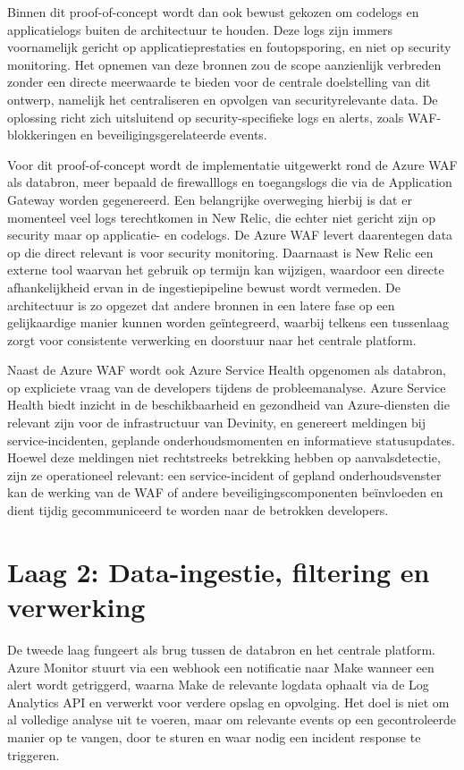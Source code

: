Binnen dit proof-of-concept wordt dan ook bewust gekozen om codelogs en applicatielogs buiten de architectuur te houden. Deze logs zijn immers voornamelijk gericht op applicatieprestaties en foutopsporing, en niet op security monitoring. Het opnemen van deze bronnen zou de scope aanzienlijk verbreden zonder een directe meerwaarde te bieden voor de centrale doelstelling van dit ontwerp, namelijk het centraliseren en opvolgen van securityrelevante data. De oplossing richt zich uitsluitend op security-specifieke logs en alerts, zoals WAF-blokkeringen en beveiligingsgerelateerde events.

Voor dit proof-of-concept wordt de implementatie uitgewerkt rond de Azure WAF als databron, meer bepaald de firewalllogs en toegangslogs die via de Application Gateway worden gegenereerd. Een belangrijke overweging hierbij is dat er momenteel veel logs terechtkomen in New Relic, die echter niet gericht zijn op security maar op applicatie- en codelogs. De Azure WAF levert daarentegen data op die direct relevant is voor security monitoring. Daarnaast is New Relic een externe tool waarvan het gebruik op termijn kan wijzigen, waardoor een directe afhankelijkheid ervan in de ingestiepipeline bewust wordt vermeden. De architectuur is zo opgezet dat andere bronnen in een latere fase op een gelijkaardige manier kunnen worden geïntegreerd, waarbij telkens een tussenlaag zorgt voor consistente verwerking en doorstuur naar het centrale platform.

Naast de Azure WAF wordt ook Azure Service Health opgenomen als databron, op expliciete vraag van de developers tijdens de probleemanalyse. Azure Service Health biedt inzicht in de beschikbaarheid en gezondheid van Azure-diensten die relevant zijn voor de infrastructuur van Devinity, en genereert meldingen bij service-incidenten, geplande onderhoudsmomenten en informatieve statusupdates. Hoewel deze meldingen niet rechtstreeks betrekking hebben op aanvalsdetectie, zijn ze operationeel relevant: een service-incident of gepland onderhoudsvenster kan de werking van de WAF of andere beveiligingscomponenten beïnvloeden en dient tijdig gecommuniceerd te worden naar de betrokken developers.


\section{Laag 2: Data-ingestie, filtering en verwerking}
De tweede laag fungeert als brug tussen de databron en het centrale platform. Azure Monitor stuurt via een webhook een notificatie naar Make wanneer een alert wordt getriggerd, waarna Make de relevante logdata ophaalt via de Log Analytics API en verwerkt voor verdere opslag en opvolging. Het doel is niet om al volledige analyse uit te voeren, maar om relevante events op een gecontroleerde manier op te vangen, door te sturen en waar nodig een incident response te triggeren.

